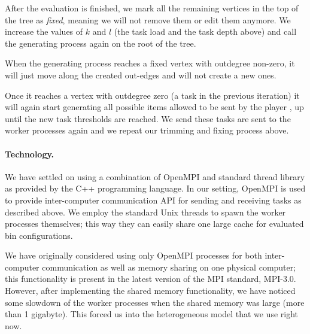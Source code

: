 After the evaluation is finished, we mark all the remaining vertices
in the top of the tree as \emph{fixed}, meaning we will not remove
them or edit them anymore. We increase the values of $k$ and $l$ (the
task load and the task depth above) and call the generating process
again on the root of the tree.

When the generating process reaches a fixed vertex with outdegree
non-zero, it will just move along the created out-edges and will not
create a new ones.

Once it reaches a vertex with outdegree zero (a task in the previous
iteration) it will again start generating all possible items allowed
to be sent by the player \adversary, up until the new task thresholds
are reached. We send these tasks are sent to the worker processes
again and we repeat our trimming and fixing process above.

\paragraph{Technology.} We have settled on using a combination of
OpenMPI \cite{openmpi} and standard thread library as provided by the
C++ programming language. In our setting, OpenMPI is used to provide
inter-computer communication API for sending and receiving tasks as
described above. We employ the standard Unix threads to spawn the
worker processes themselves; this way they can easily share one large
cache for evaluated bin configurations.

We have originally considered using only OpenMPI processes for both
inter-computer communication as well as memory sharing on one physical
computer; this functionality is present in the latest version of the
MPI standard, MPI-3.0. However, after implementing the shared memory
functionality, we have noticed some slowdown of the worker processes
when the shared memory was large (more than 1 gigabyte). This forced
us into the heterogeneous model that we use right now.

